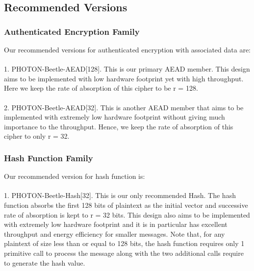 \documentclass{article}
\begin{document}
\subsection{Recommended Versions}
\subsubsection{Authenticated Encryption Family}
Our recommended versions for authenticated encryption with associated data are:\\\\
1. PHOTON-Beetle-AEAD[128]. This is our primary AEAD member. This design aims to be implemented with low hardware footprint yet with high throughput. Here we keep the rate of absorption of this cipher to be r = 128.\\\\
2. PHOTON-Beetle-AEAD[32]. This is another AEAD member that aims to be implemented with extremely low hardware footprint without giving much importance to the throughput. Hence, we keep the rate of absorption of this cipher to only r = 32.
\subsubsection{Hash Function Family}
Our recommended version for hash function is:\\\\
1. PHOTON-Beetle-Hash[32]. This is our only recommended Hash. The hash function absorbs the first 128 bits of plaintext as the initial vector and successive rate of absorption is kept to r = 32 bits. This design also aims to be implemented with extremely low hardware footprint and it is in particular has excellent throughput and energy efficiency for smaller messages. Note that, for any plaintext of size less than or equal to 128 bits, the hash function requires only 1 primitive call to process the message along with the two additional calls require to generate the hash value.
\end{document}
